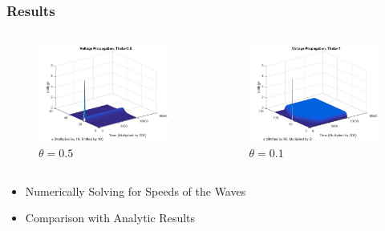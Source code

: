 \documentclass{beamer}
\begin{document}
\begin{frame}
\frametitle{Results}

\begin{columns}


\begin{column}{.5\textwidth}
\begin{figure}[H]
  \includegraphics[width=\linewidth]{thetatwo.jpg}
  \caption{$\theta=0.5$}
  \label{fig:sketch5}
\end{figure}
\end{column}

\begin{column}{.5\textwidth}
\begin{figure}[H]
  \includegraphics[width=\linewidth]{thetathree.jpg}
  \caption{$\theta=0.1$}
  \label{fig:sketch6}
\end{figure}
\end{column}

\end{columns}
\begin{itemize}
	\item{Numerically Solving for Speeds of the Waves}
	\item{Comparison with Analytic Results}
\end{itemize}
\end{frame}
\end{document}
